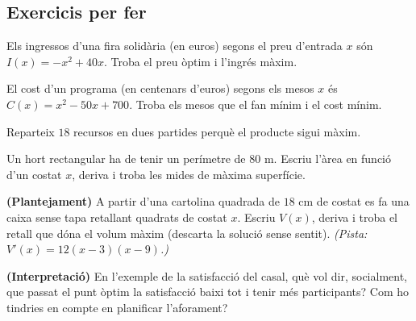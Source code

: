 \subsection{Exercicis per fer}

\begin{exercicis}
\begin{exlist}
  \item Els ingressos d'una fira solidària (en euros) segons el preu d'entrada $x$ són
        $I(x)=-x^2+40x$. Troba el preu òptim i l'ingrés màxim.
  \item El cost d'un programa (en centenars d'euros) segons els mesos $x$ és
        $C(x)=x^2-50x+700$. Troba els mesos que el fan mínim i el cost mínim.
  \item Reparteix $18$ recursos en dues partides perquè el producte sigui màxim.
  \item Un hort rectangular ha de tenir un perímetre de $80$ m. Escriu l'àrea en funció
        d'un costat $x$, deriva i troba les mides de màxima superfície.
  \item \textbf{(Plantejament)} A partir d'una cartolina quadrada de $18$ cm de costat
        es fa una caixa sense tapa retallant quadrats de costat $x$. Escriu $V(x)$,
        deriva i troba el retall que dóna el volum màxim (descarta la solució sense
        sentit). \emph{(Pista: $V'(x)=12(x-3)(x-9)$.)}
  \item \textbf{(Interpretació)} En l'exemple de la satisfacció del casal, què vol dir,
        socialment, que passat el punt òptim la satisfacció baixi tot i tenir més
        participants? Com ho tindries en compte en planificar l'aforament?
\end{exlist}
\end{exercicis}

